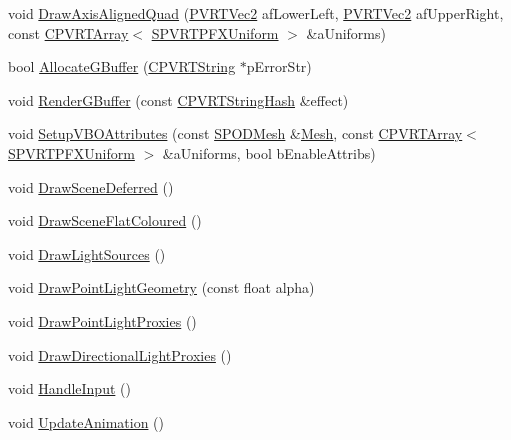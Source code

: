 \begin{DoxyCompactItemize}
void \hyperlink{class_o_g_l_e_s2_deferred_shading_ac768f66c26ba8d627362c34e67038512}{Draw\+Axis\+Aligned\+Quad} (\hyperlink{struct_p_v_r_t_vec2}{P\+V\+R\+T\+Vec2} af\+Lower\+Left, \hyperlink{struct_p_v_r_t_vec2}{P\+V\+R\+T\+Vec2} af\+Upper\+Right, const \hyperlink{class_c_p_v_r_t_array}{C\+P\+V\+R\+T\+Array}$<$ \hyperlink{struct_s_p_v_r_t_p_f_x_uniform}{S\+P\+V\+R\+T\+P\+F\+X\+Uniform} $>$ \&a\+Uniforms)
\item 
bool \hyperlink{class_o_g_l_e_s2_deferred_shading_a661427204bf1fbbdea09d78e185058f8}{Allocate\+G\+Buffer} (\hyperlink{class_c_p_v_r_t_string}{C\+P\+V\+R\+T\+String} $\ast$p\+Error\+Str)
\item 
void \hyperlink{class_o_g_l_e_s2_deferred_shading_a14e05a2754e60250f56c0d0f1a955994}{Render\+G\+Buffer} (const \hyperlink{class_c_p_v_r_t_string_hash}{C\+P\+V\+R\+T\+String\+Hash} \&effect)
\item 
void \hyperlink{class_o_g_l_e_s2_deferred_shading_a571fa8dd4ca7bd4730a87bd14de410eb}{Setup\+V\+B\+O\+Attributes} (const \hyperlink{struct_s_p_o_d_mesh}{S\+P\+O\+D\+Mesh} \&\hyperlink{class_mesh}{Mesh}, const \hyperlink{class_c_p_v_r_t_array}{C\+P\+V\+R\+T\+Array}$<$ \hyperlink{struct_s_p_v_r_t_p_f_x_uniform}{S\+P\+V\+R\+T\+P\+F\+X\+Uniform} $>$ \&a\+Uniforms, bool b\+Enable\+Attribs)
\item 
void \hyperlink{class_o_g_l_e_s2_deferred_shading_a95f622dabbb285b762a9e0d722f58266}{Draw\+Scene\+Deferred} ()
\item 
void \hyperlink{class_o_g_l_e_s2_deferred_shading_a35ff77dd5771730400d75fe69a8a27f0}{Draw\+Scene\+Flat\+Coloured} ()
\item 
void \hyperlink{class_o_g_l_e_s2_deferred_shading_a1d00a8f1769b808054f67b0da8a54b24}{Draw\+Light\+Sources} ()
\item 
void \hyperlink{class_o_g_l_e_s2_deferred_shading_a5ec0f23500dc738134a23f9917eb02ec}{Draw\+Point\+Light\+Geometry} (const float alpha)
\item 
void \hyperlink{class_o_g_l_e_s2_deferred_shading_aaf03dc6454b1952d4683b60a74712013}{Draw\+Point\+Light\+Proxies} ()
\item 
void \hyperlink{class_o_g_l_e_s2_deferred_shading_ae148cefd345711620d310425766abf27}{Draw\+Directional\+Light\+Proxies} ()
\item 
void \hyperlink{class_o_g_l_e_s2_deferred_shading_a65513ab0d66b8878262e607ec39071bd}{Handle\+Input} ()
\item 
void \hyperlink{class_o_g_l_e_s2_deferred_shading_a36c1da6295be7e3ae1c0e878a101cf2d}{Update\+Animation} ()
\end{DoxyCompactItemize}



